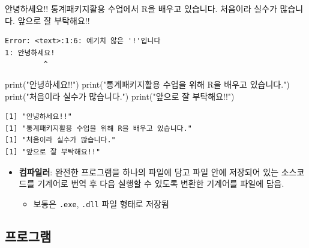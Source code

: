 \documentclass[
  11pt,
]{krantz}
\newenvironment{Shaded}{\begin{snugshade}}{\end{snugshade}}
\newcommand{\FunctionTok}[1]{\textcolor[rgb]{0,0,0}{#1}}
\newcommand{\NormalTok}[1]{#1}
\newcommand{\SpecialCharTok}[1]{\textcolor[rgb]{0,0,0}{#1}}
\newcommand{\StringTok}[1]{\textcolor[rgb]{0.5,0.5,0.5}{#1}}
\providecommand{\tightlist}{%
  \setlength{\itemsep}{0pt}\setlength{\parskip}{0pt}}
\begin{document}
\footnotesize

\begin{Shaded}
\begin{Highlighting}[]
\NormalTok{안녕하세요}\SpecialCharTok{!!}
\NormalTok{통계패키지활용 수업에서 R을 배우고 있습니다. }
\NormalTok{처음이라 실수가 많습니다.}
\NormalTok{앞으로 잘 부탁해요}\SpecialCharTok{!!}
\end{Highlighting}
\end{Shaded}

\begin{verbatim}
Error: <text>:1:6: 예기치 않은 '!'입니다
1: 안녕하세요!
         ^
\end{verbatim}

\normalsize

\footnotesize

\begin{Shaded}
\begin{Highlighting}[]
\FunctionTok{print}\NormalTok{(}\StringTok{"안녕하세요!!"}\NormalTok{)}
\FunctionTok{print}\NormalTok{(}\StringTok{"통계패키지활용 수업을 위해 R을 배우고 있습니다."}\NormalTok{)}
\FunctionTok{print}\NormalTok{(}\StringTok{"처음이라 실수가 많습니다."}\NormalTok{)}
\FunctionTok{print}\NormalTok{(}\StringTok{"앞으로 잘 부탁해요!!"}\NormalTok{)}
\end{Highlighting}
\end{Shaded}

\begin{verbatim}
[1] "안녕하세요!!"
[1] "통계패키지활용 수업을 위해 R을 배우고 있습니다."
[1] "처음이라 실수가 많습니다."
[1] "앞으로 잘 부탁해요!!"
\end{verbatim}

\normalsize

\begin{itemize}
\tightlist
\item
  \textbf{컴파일러}: 완전한 프로그램을 하나의 파일에 담고 파일 안에 저장되어 있는 소스코드를 기계어로 번역 후 다음 실행할 수 있도록 변환한 기계어를 파일에 담음.

  \begin{itemize}
  \tightlist
  \item
    보통은 \texttt{.exe}, \texttt{.dll} 파일 형태로 저장됨
  \end{itemize}
\end{itemize}

\hypertarget{control-program}{%
\subsection{프로그램}\label{control-program}}
\end{document}
